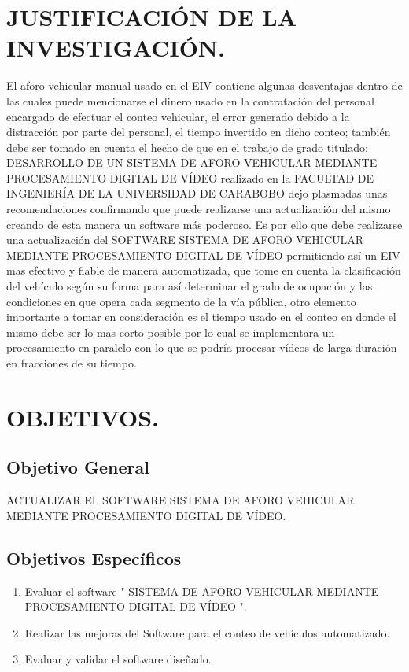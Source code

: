 \section{JUSTIFICACIÓN DE LA INVESTIGACIÓN.}

El aforo vehicular manual usado en el EIV contiene algunas desventajas dentro de las cuales puede mencionarse el dinero usado en la contratación del personal encargado de efectuar el conteo vehicular, el error generado debido a la distracción por parte del personal, el tiempo invertido en dicho conteo; también debe ser tomado  en cuenta el hecho de que en el trabajo de grado titulado: DESARROLLO DE UN SISTEMA DE AFORO VEHICULAR MEDIANTE PROCESAMIENTO DIGITAL DE VÍDEO realizado en la FACULTAD DE INGENIERÍA DE LA UNIVERSIDAD DE CARABOBO dejo plasmadas unas recomendaciones confirmando que puede realizarse una actualización del mismo creando de esta manera un software  m\'as poderoso. Es por ello que debe realizarse una actualización del SOFTWARE SISTEMA DE AFORO VEHICULAR MEDIANTE PROCESAMIENTO DIGITAL DE VÍDEO permitiendo así un EIV mas efectivo y fiable de manera automatizada, que tome en cuenta la clasificación del vehículo según su forma para así  determinar el grado de ocupación y las condiciones en que opera cada segmento de la vía p\'ublica, otro elemento importante a tomar en consideración es el tiempo usado en el conteo en donde el mismo debe ser lo mas corto posible por lo cual se implementara un procesamiento en paralelo con lo que se podría procesar vídeos de larga duración en fracciones de su tiempo. 

\section{OBJETIVOS.}
\subsection{Objetivo General}
ACTUALIZAR EL SOFTWARE SISTEMA DE AFORO VEHICULAR MEDIANTE PROCESAMIENTO DIGITAL DE VÍDEO.
\subsection{Objetivos Específicos}
\begin{enumerate}
	\item Evaluar el software " SISTEMA DE AFORO VEHICULAR MEDIANTE PROCESAMIENTO DIGITAL DE VÍDEO ".
	\item Realizar las mejoras del Software para el conteo de vehículos automatizado.
	\item Evaluar y validar el software diseñado.
	
\end{enumerate}

